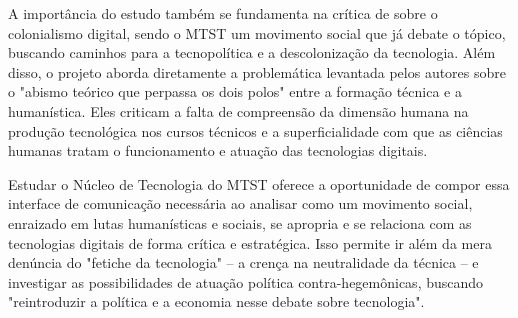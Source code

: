 A importância do estudo também se fundamenta na crítica de  sobre o colonialismo digital, sendo o MTST um movimento social que já debate o tópico, buscando caminhos para a tecnopolítica e a descolonização da tecnologia. Além disso, o projeto aborda diretamente a problemática levantada pelos autores sobre o "abismo teórico que perpassa os dois polos" \cite[p.~30]{Faustino2023} entre a formação técnica e a humanística. Eles criticam a falta de compreensão da dimensão humana na produção tecnológica nos cursos técnicos e a superficialidade com que as ciências humanas tratam o funcionamento e atuação das tecnologias digitais. 

Estudar o Núcleo de Tecnologia do MTST oferece a oportunidade de compor essa interface de comunicação necessária ao analisar como um movimento social, enraizado em lutas humanísticas e sociais, se apropria e se relaciona com as tecnologias digitais de forma crítica e estratégica. Isso permite ir além da mera denúncia do "fetiche da tecnologia" – a crença na neutralidade da técnica – e investigar as possibilidades de atuação política contra-hegemônicas, buscando "reintroduzir a política e a economia nesse debate sobre tecnologia".